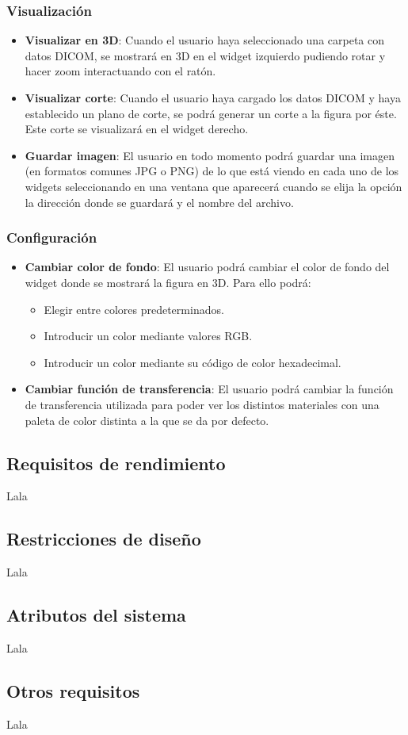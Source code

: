 \subsubsection{Visualización}
\begin{itemize}
	\item \textbf{Visualizar en 3D}: Cuando el usuario haya seleccionado una carpeta con datos DICOM, se mostrará en 3D en el widget izquierdo pudiendo rotar y hacer zoom interactuando con el ratón.
	\item \textbf{Visualizar corte}: Cuando el usuario haya cargado los datos DICOM y haya establecido un plano de corte, se podrá generar un corte a la figura por éste. Este corte se visualizará en el widget derecho.
	\item \textbf{Guardar imagen}: El usuario en todo momento podrá guardar una imagen (en formatos comunes JPG o PNG) de lo que está viendo en cada uno de los widgets seleccionando en una ventana que aparecerá cuando se elija la opción la dirección donde se guardará y el nombre del archivo. 
\end{itemize}

\subsubsection{Configuración}
\begin{itemize}
	\item \textbf{Cambiar color de fondo}: El usuario podrá cambiar el color de fondo del widget donde se mostrará la figura en 3D. Para ello podrá:
	\begin{itemize}
		\item Elegir entre colores predeterminados.
		\item Introducir un color mediante valores RGB.
		\item Introducir un color mediante su código de color hexadecimal.
	\end{itemize}
	\item \textbf{Cambiar función de transferencia}: El usuario podrá cambiar la función de transferencia utilizada para poder ver los distintos materiales con una paleta de color distinta a la que se da por defecto.
\end{itemize}

\subsection{Requisitos de rendimiento}

Lala

\subsection{Restricciones de diseño}

Lala

\subsection{Atributos del sistema}

Lala

\subsection{Otros requisitos}

Lala